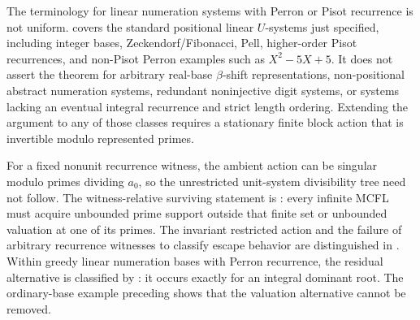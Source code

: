 \begin{remark}
  \label{rem:pisot-open-interfaces}
  The terminology for linear numeration systems with Perron or Pisot
  recurrence is not uniform.
   covers the standard
  positional linear \(U\)-systems just specified, including integer
  bases, Zeckendorf/Fibonacci, Pell, higher-order Pisot recurrences, and
  non-Pisot Perron examples such as \(X^2-5X+5\).
  It does not assert the theorem for arbitrary real-base
  \(\beta\)-shift representations, non-positional abstract numeration
  systems, redundant noninjective digit systems, or systems lacking an
  eventual integral recurrence and strict length ordering. Extending
  the argument to any of those classes requires a stationary finite
  block action that is invertible modulo represented primes.

  For a fixed nonunit recurrence witness, the ambient action can be
  singular modulo primes dividing \(a_0\), so the unrestricted unit-system
  divisibility tree need not follow. The witness-relative surviving
  statement is : every infinite
  MCFL must acquire unbounded prime support outside that finite set or
  unbounded valuation at one of its primes. The invariant restricted
  action and the failure of arbitrary recurrence witnesses to classify
  escape behavior are distinguished in
  .
  Within greedy linear numeration bases with Perron recurrence, the residual
  alternative is classified
  by : it occurs exactly
  for an integral dominant root.  The ordinary-base example preceding
   shows that the valuation
  alternative cannot be removed.
\end{remark}
